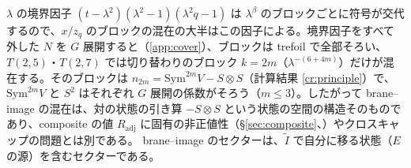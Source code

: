 $\lambda$ の境界因子 $(t-\lambda^2)(\lambda^2-1)(\lambda^2q-1)$ は $\lambda^\beta$ のブロックごとに符号が交代するので、$x/z_q$ のブロックの混在の大半はこの因子による。境界因子をすべて外した $N$ を $G$ 展開すると（\ref{app:cover}）、ブロックは trefoil で全部そろい、$T(2,5)$・$T(2,7)$ では切り替わりのブロック $k = 2m$（$\lambda^{-(6+4m)}$）だけが混在する。そのブロックは $n_{2m} = \mathrm{Sym}^{2m}V - S\otimes S$（計算結果 \ref{cr:principle}）で、$\mathrm{Sym}^{2m}V$ と $S^2$ はそれぞれ $G$ 展開の係数がそろう（$m \le 3$）。したがって brane--image の混在は、対の状態の引き算 $-S\otimes S$ という状態の空間の構造そのものであり、composite の値 $R_{\mathrm{adj}}$ に固有の非正値性（§\ref{sec:composite}、\cite{CE15}）やクロスキャップの問題とは別である。
brane--image のセクターは、$\tilde I$ で自分に移る状態（$E$ の源）を含むセクターである。

